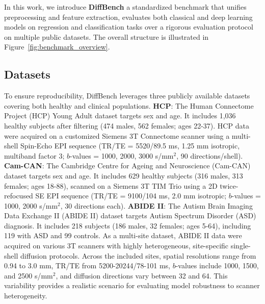 
In this work, we introduce \textbf{DiffBench} a standardized benchmark that unifies preprocessing and feature extraction, evaluates both 
classical and deep learning models on regression and classification tasks over a rigorous evaluation protocol on multiple
public datasets. The overall structure is illustrated in Figure~\ref{fig:benchmark_overview}.

\subsection{Datasets}
To ensure reproducibility, DiffBench leverages three publicly available datasets 
covering both healthy and clinical populations.
\textbf{HCP}: The Human Connectome Project (HCP) Young Adult dataset \cite{van2013wu} targets sex and age. It includes 
1,036 healthy subjects after filtering (474 males, 562 females; ages 22-37).
HCP data were acquired on a customized Siemens 3T Connectome scanner using a multi-shell Spin-Echo EPI sequence 
(TR/TE = 5520/89.5 ms, 1.25 mm isotropic, multiband factor 3; $b$-values = 1000, 2000, 3000 s/mm$^2$, 90 directions/shell).
\textbf{Cam-CAN}: The Cambridge Centre for Ageing and Neuroscience (Cam-CAN) dataset \cite{shafto2014cambridge} targets 
sex and age. It includes 629 healthy subjects (316 males, 313 females; ages 18-88), scanned on a Siemens 3T TIM Trio using 
a 2D twice-refocused SE EPI sequence (TR/TE = 9100/104 ms, 2.0 mm isotropic; $b$-values = 1000, 2000 s/mm$^2$, 30 directions each).
\textbf{ABIDE II}: The Autism Brain Imaging Data Exchange II (ABIDE II) dataset \cite{di2017enhancing} targets Autism Spectrum 
Disorder (ASD) diagnosis.
It includes 218 subjects (186 males, 32 females; ages 5-64), including 119 with ASD and 99 controls.
As a multi-site dataset, ABIDE II data were acquired on various 3T scanners with highly heterogeneous, site-specific 
single-shell diffusion protocols.
Across the included sites, spatial resolutions range from 0.94 to 3.0 mm, TR/TE from 5200-20244/78-101 ms, $b$-values include 
1000, 1500, and 2500 s/mm$^2$, and diffusion directions vary between 32 and 64.
This variability provides a realistic scenario for evaluating model robustness to scanner heterogeneity.


